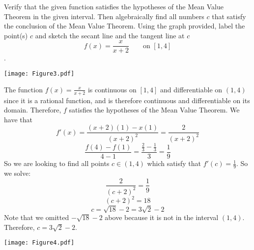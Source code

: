 \documentclass[handout,nooutcomes]{ximera}
\begin{document}
\newpage







\begin{problem}
Verify that the given function satisfies the hypotheses of the Mean Value Theorem in the given interval.  Then algebraically find all numbers $c$ that satisfy the conclusion of the Mean Value Theorem.  Using the graph provided, label the point(s) $c$ and sketch the secant line and the tangent line at $c$
$$ f(x) = \frac{x}{x+2} \qquad \text{on } [1,4] $$.
	\begin{image}
	\texttt{[image: Figure3.pdf]}
	\end{image}
		\begin{freeResponse}
		The function $f(x) = \frac{x}{x+2}$ is continuous on $[1,4]$ and differentiable on $(1,4)$ since it is a rational function, and is therefore continuous and differentiable on its domain.  Therefore, $f$ satisfies the hypotheses of the Mean Value Theorem.  We have that
		$$ f'(x) = \frac{(x+2)(1) - x(1)}{(x+2)^2} = \frac{2}{(x+2)^2} $$
		$$ \frac{f(4) - f(1)}{4-1} = \frac{\frac{2}{3} - \frac{1}{3}}{3} = \frac{1}{9} $$
		So we are looking to find all points $c \in (1,4)$ which satisfy that $ f'(c) = \frac{1}{9} $.  So we solve:
		$$ \frac{2}{(c+2)^2} = \frac{1}{9} $$
		$$ (c+2)^2 = 18 $$
		$$ c = \sqrt{18} - 2 = 3\sqrt{2} - 2 $$
		Note that we omitted $-\sqrt{18} - 2$ above because it is not in the interval $(1,4)$.  Therefore, $c = 3\sqrt{2} - 2$.
		
		\begin{image}
		\texttt{[image: Figure4.pdf]}
		\end{image}
		
		\end{freeResponse}
		
		
\end{problem}









	
	
	
	
	
	
	
	
			
			
\end{document}
